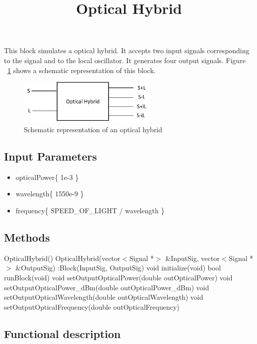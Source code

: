 \documentclass[a4paper]{article}
\title{Optical Hybrid}
\begin{document}
\maketitle

This block simulates a optical hybrid. It accepts two input signals corresponding to the signal and to the local oscillator. It generates four output signals. Figure ~\ref{opticalhybrid} shows a schematic representation of this block.

\begin{figure}[h]
	\centering\includegraphics[width=0.6\textwidth]{optical_hybrid.png}
	\caption{Schematic representation of an optical hybrid}\label{opticalhybrid}
\end{figure}

\subsection*{Input Parameters}

\begin{itemize}
	\item opticalPower\{ 1e-3 \} 
	\item wavelength\{ 1550e-9 \}
	\item frequency\{ SPEED\_OF\_LIGHT / wavelength \}
\end{itemize}

\subsection*{Methods}
 
OpticalHybrid() {}
\bigbreak
OpticalHybrid(vector$<$Signal *$>$ \&InputSig, vector$<$Signal *$>$ \&OutputSig) :Block(InputSig, OutputSig) {}
\bigbreak
void initialize(void)
\bigbreak
bool runBlock(void)
\bigbreak
void setOutputOpticalPower(double outOpticalPower)
\bigbreak
void setOutputOpticalPower\_dBm(double outOpticalPower\_dBm)
\bigbreak
void setOutputOpticalWavelength(double outOpticalWavelength)
\bigbreak
void setOutputOpticalFrequency(double outOpticalFrequency) 

\subsection*{Functional description}
\end{document}
